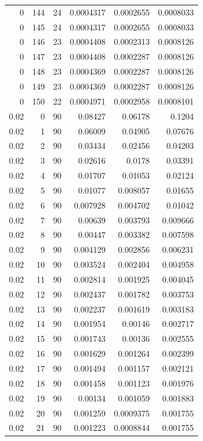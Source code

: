 \begin{tabular}{rrrrrr}
0 & 144 & 24 & 0.0004317 & 0.0002655 & 0.0008033 \\
0 & 145 & 24 & 0.0004317 & 0.0002655 & 0.0008033 \\
0 & 146 & 23 & 0.0004408 & 0.0002313 & 0.0008126 \\
0 & 147 & 23 & 0.0004408 & 0.0002287 & 0.0008126 \\
0 & 148 & 23 & 0.0004369 & 0.0002287 & 0.0008126 \\
0 & 149 & 23 & 0.0004369 & 0.0002287 & 0.0008126 \\
0 & 150 & 22 & 0.0004971 & 0.0002958 & 0.0008101 \\
0.02 & 0 & 90 & 0.08427 & 0.06178 & 0.1204 \\
0.02 & 1 & 90 & 0.06009 & 0.04905 & 0.07676 \\
0.02 & 2 & 90 & 0.03434 & 0.02456 & 0.04203 \\
0.02 & 3 & 90 & 0.02616 & 0.0178 & 0.03391 \\
0.02 & 4 & 90 & 0.01707 & 0.01053 & 0.02124 \\
0.02 & 5 & 90 & 0.01077 & 0.008057 & 0.01655 \\
0.02 & 6 & 90 & 0.007928 & 0.004702 & 0.01042 \\
0.02 & 7 & 90 & 0.00639 & 0.003793 & 0.009666 \\
0.02 & 8 & 90 & 0.00447 & 0.003382 & 0.007598 \\
0.02 & 9 & 90 & 0.004129 & 0.002856 & 0.006231 \\
0.02 & 10 & 90 & 0.003524 & 0.002404 & 0.004958 \\
0.02 & 11 & 90 & 0.002814 & 0.001925 & 0.004045 \\
0.02 & 12 & 90 & 0.002437 & 0.001782 & 0.003753 \\
0.02 & 13 & 90 & 0.002237 & 0.001619 & 0.003183 \\
0.02 & 14 & 90 & 0.001954 & 0.00146 & 0.002717 \\
0.02 & 15 & 90 & 0.001743 & 0.00136 & 0.002555 \\
0.02 & 16 & 90 & 0.001629 & 0.001264 & 0.002399 \\
0.02 & 17 & 90 & 0.001494 & 0.001157 & 0.002121 \\
0.02 & 18 & 90 & 0.001458 & 0.001123 & 0.001976 \\
0.02 & 19 & 90 & 0.00134 & 0.001059 & 0.001883 \\
0.02 & 20 & 90 & 0.001259 & 0.0009375 & 0.001755 \\
0.02 & 21 & 90 & 0.001223 & 0.0008844 & 0.001755 \\

\end{tabular}
